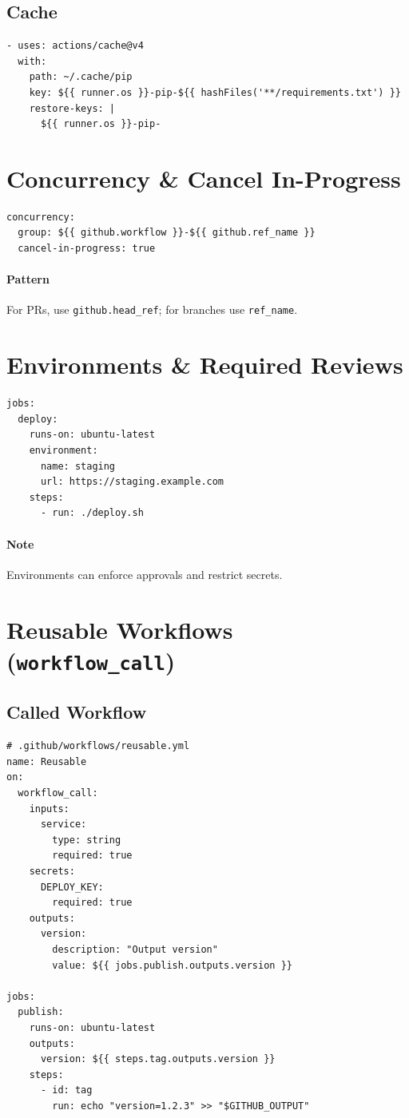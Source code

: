 \documentclass[11pt]{article}
\begin{document}
\subsection{Cache}
\begin{verbatim}
- uses: actions/cache@v4
  with:
    path: ~/.cache/pip
    key: ${{ runner.os }}-pip-${{ hashFiles('**/requirements.txt') }}
    restore-keys: |
      ${{ runner.os }}-pip-
\end{verbatim}

\section{Concurrency \& Cancel In-Progress}
\begin{verbatim}
concurrency:
  group: ${{ github.workflow }}-${{ github.ref_name }}
  cancel-in-progress: true
\end{verbatim}
\paragraph{Pattern} For PRs, use \texttt{github.head\_ref}; for branches use \texttt{ref\_name}.
\clearpage

\section{Environments \& Required Reviews}
\begin{verbatim}
jobs:
  deploy:
    runs-on: ubuntu-latest
    environment:
      name: staging
      url: https://staging.example.com
    steps:
      - run: ./deploy.sh
\end{verbatim}
\paragraph{Note} Environments can enforce approvals and restrict secrets.

\section{Reusable Workflows (\texttt{workflow\_call})}
\subsection{Called Workflow}
\begin{verbatim}
# .github/workflows/reusable.yml
name: Reusable
on:
  workflow_call:
    inputs:
      service:
        type: string
        required: true
    secrets:
      DEPLOY_KEY:
        required: true
    outputs:
      version:
        description: "Output version"
        value: ${{ jobs.publish.outputs.version }}

jobs:
  publish:
    runs-on: ubuntu-latest
    outputs:
      version: ${{ steps.tag.outputs.version }}
    steps:
      - id: tag
        run: echo "version=1.2.3" >> "$GITHUB_OUTPUT"
\end{verbatim}
\end{document}
